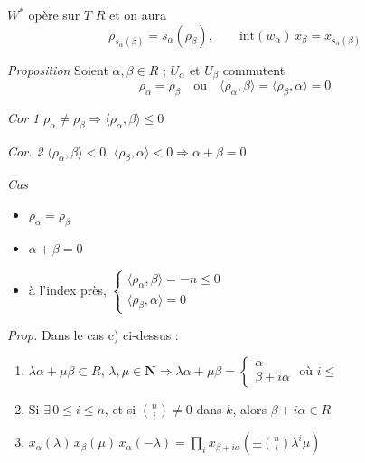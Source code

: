 \documentclass[11pt,a4paper]{article}
\begin{document}

$W^{*}$ opère sur $T$ \ill{} \struck{\ill{}} $R$ et on aura
\[
  \rho_{s_\alpha(\beta)} = s_\alpha(\rho_\beta), \qquad
  \mathrm{int}(w_\alpha)\,x_\beta = x_{s_\alpha(\beta)}
\]


\emph{Proposition} Soient $\alpha, \beta \in R$ ; $U_\alpha$ et $U_\beta$
commutent \ill{}
\[
  \rho_\alpha = \rho_\beta \quad \text{ou} \quad
  \langle \rho_\alpha, \beta \rangle = \langle \rho_\beta, \alpha \rangle = 0
\]

\emph{Cor 1} $\rho_\alpha \neq \rho_\beta \Longrightarrow \langle \rho_\alpha,
\beta \rangle \leq 0$

\emph{Cor. 2} $\langle \rho_\alpha, \beta \rangle < 0$, $\langle \rho_\beta,
\alpha \rangle < 0 \Longrightarrow \alpha + \beta = 0$


\emph{Cas}
\begin{itemize}
  \item[a)] $\rho_\alpha = \rho_\beta$
  \item[b)] $\alpha + \beta = 0$
  \item[c)] à l'index près, \quad $\left\{
    \begin{array}{l}
      \langle \rho_\alpha, \beta \rangle = -n \leq 0 \\
      \langle \rho_\beta, \alpha \rangle = 0
    \end{array} \right.$
\end{itemize}

\emph{Prop.} Dans le cas c) ci-dessus :
\begin{enumerate}
  \item[1)] $\lambda\alpha + \mu\beta \subset R$, $\lambda, \mu \in \mathbf{N}
    \Longrightarrow \lambda\alpha + \mu\beta = \left\{
    \begin{array}{l} \alpha \\ \beta + i\alpha \end{array} \right.$
    \; où $i \leq$ \ill{}
  \item[2)] Si $\exists\, 0 \leq i \leq n$, et si $\binom{n}{i} \neq 0$ dans
    $k$, alors $\beta + i\alpha \in R$ 
  \item[3)] $x_\alpha(\lambda)\,x_\beta(\mu)\,x_\alpha(-\lambda) = \prod_i
    x_{\beta + i\alpha}\left(\pm \binom{n}{i} \lambda^{i} \mu\right)$
\end{enumerate}
\end{document}
